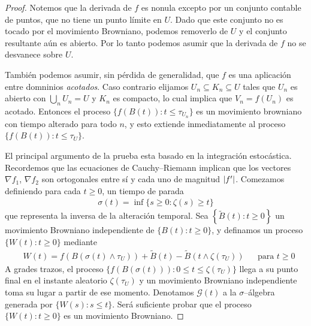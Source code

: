 \documentclass{report}
\newcommand{\brownian}{B}
\newcommand{\alteredBrownian}{\widetilde{\brownian}}
\newcommand{\wiener}{W}
\DeclarePairedDelimiter{\abs}{\lvert}{\rvert}
\theoremstyle{plain}
\theoremstyle{remark}
\theoremstyle{definition}
\begin{document}
\begin{proof}
  Notemos que la derivada de \(f\) es nonula excepto por un conjunto contable de puntos, que no tiene un punto límite en \(U\).
  Dado que este conjunto no es tocado por el movimiento Browniano, podemos removerlo de \(U\) y el conjunto resultante aún es abierto.
  Por lo tanto podemos asumir que la derivada de \(f\) no se desvanece sobre \(U\).

  También podemos asumir, sin pérdida de generalidad, que \(f\) es una aplicación entre domninios \emph{acotados}.
  Caso contrario elijamos \(U_n \subseteq K_n \subseteq U\) tales que \(U_n\) es abierto con \(\bigcup_n U_n = U\) y \(K_n\) es compacto, lo cual implica que \(V_n = f(U_n)\) es acotado.
  Entonces el proceso \(\{f(\brownian(t)) : t \leq \tau_{U_n}\}\) es un movimiento browniano con tiempo alterado para todo \(n\), y esto extiende inmediatamente al proceso \(\{f(\brownian(t)) : t \leq \tau_U\}\).

  El principal argumento de la prueba esta basado en la integración estocástica.
  Recordemos que las ecuaciones de Cauchy--Riemann implican que los vectores \(\nabla f_1\), \(\nabla f_2\) son ortogonales entre sí y cada uno de magnitud \(\abs{f'}\).
  Comezamos definiendo para cada \(t \geq 0\), un tiempo de parada
  \begin{align}
    \sigma(t) = \inf \{s \geq 0 : \zeta(s) \geq t\}
  \end{align}
  que representa la inversa de la alteración temporal.
  Sea \(\left\{ \alteredBrownian(t) : t \geq 0 \right\}\) un movimiento Browniano independiente de \(\{\brownian(t) : t \geq 0\}\), y definamos un proceso \(\{\wiener(t) : t \geq 0\}\) mediante
  \begin{align}
    &\wiener(t)
    =
    f(\brownian(\sigma(t) \wedge \tau_U))
      + \alteredBrownian(t) - \alteredBrownian(t \wedge \zeta(\tau_U))
    &&\text{para } t \geq 0
  \end{align}
  A grades trazos, el proceso \(\{f(\brownian(\sigma(t))) : 0 \leq t \leq \zeta(\tau_U)\}\) llega a su punto final en el instante aleatorio \(\zeta(\tau_U)\) y un movimiento Browniano independiente toma su lugar a partir de ese momento.
  Denotamos \(\mathcal{G}(t)\) a la \(\sigma\)--álgebra generada por \(\{\wiener(s) : s \leq t\}\).
  Será suficiente probar que el proceso \(\{\wiener(t) : t \geq 0\}\) es un movimiento Browniano.
  

\end{proof}
\end{document}
